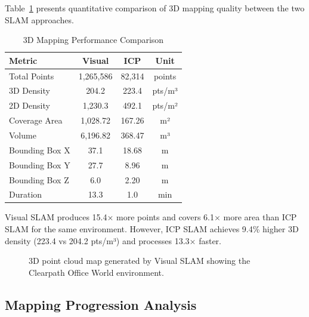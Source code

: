 \documentclass[conference]{IEEEtran}
\begin{document}
Table~\ref{tab:mapping_comparison} presents quantitative comparison of 3D mapping quality between the two SLAM approaches.

\begin{table}[htbp]
\caption{3D Mapping Performance Comparison}
\begin{center}
\begin{tabular}{|l|c|c|c|}
\hline
\textbf{Metric} & \textbf{Visual} & \textbf{ICP} & \textbf{Unit} \\
\hline
Total Points & 1,265,586 & 82,314 & points \\
3D Density & 204.2 & 223.4 & pts/m³ \\
2D Density & 1,230.3 & 492.1 & pts/m² \\
Coverage Area & 1,028.72 & 167.26 & m² \\
Volume & 6,196.82 & 368.47 & m³ \\
Bounding Box X & 37.1 & 18.68 & m \\
Bounding Box Y & 27.7 & 8.96 & m \\
Bounding Box Z & 6.0 & 2.20 & m \\
Duration & 13.3 & 1.0 & min \\
\hline
\end{tabular}
\label{tab:mapping_comparison}
\end{center}
\end{table}

Visual SLAM produces 15.4× more points and covers 6.1× more area than ICP SLAM for the same environment. However, ICP SLAM achieves 9.4\% higher 3D density (223.4 vs 204.2 pts/m³) and processes 13.3× faster.

\begin{figure}[htbp]
\centerline{
}
\caption{3D point cloud map generated by Visual SLAM showing the Clearpath Office World environment.}
\label{fig:pointcloud}
\end{figure}

\subsection{Mapping Progression Analysis}
\end{document}
